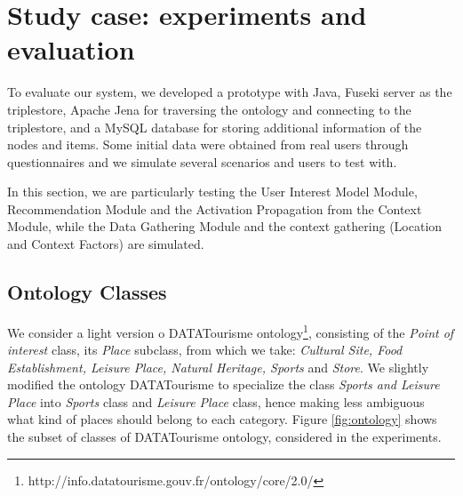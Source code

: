 \section{Study case: experiments and evaluation} \label{section:study-case}

To evaluate our system,  we developed a prototype with Java, 
Fuseki server as the triplestore, Apache Jena for traversing the ontology and connecting to the triplestore, and a MySQL database for storing additional information of the nodes and items. Some initial data were obtained from real users through questionnaires and we simulate several scenarios  and users to test with.

In this section, we are particularly testing the User Interest Model Module, Recommendation Module and the Activation Propagation from the Context Module, while the Data Gathering Module and the context gathering (Location and Context Factors) are simulated.


\subsection{Ontology Classes}
We consider a light version o DATATourisme ontology\footnote{http://info.datatourisme.gouv.fr/ontology/core/2.0/}, consisting of the \textit{Point of interest} class, its \textit{Place} subclass, from which we take: \textit{Cultural Site, Food Establishment, Leisure Place, Natural Heritage, Sports} and \textit{Store}.  We slightly modified the ontology DATATourisme to specialize the class \textit{Sports and Leisure Place} into \textit{Sports} class and \textit{Leisure Place} class, hence making less ambiguous what kind of places should belong to each category. Figure \ref{fig:ontology} shows the subset of classes of DATATourisme ontology, considered  in the experiments. 



